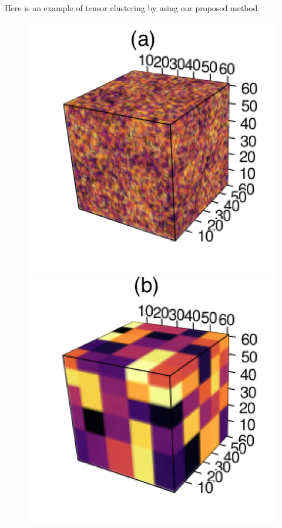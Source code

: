 \documentclass{article}
\begin{document}
Here is an example of tensor clustering by using our proposed method.
\begin{figure}[!h]
	\centering
	\includegraphics[scale=0.35]{figures/figure1/input.png}
	\includegraphics[scale=0.35]{figures/figure1/truth.png}

\end{figure}
\end{document}
